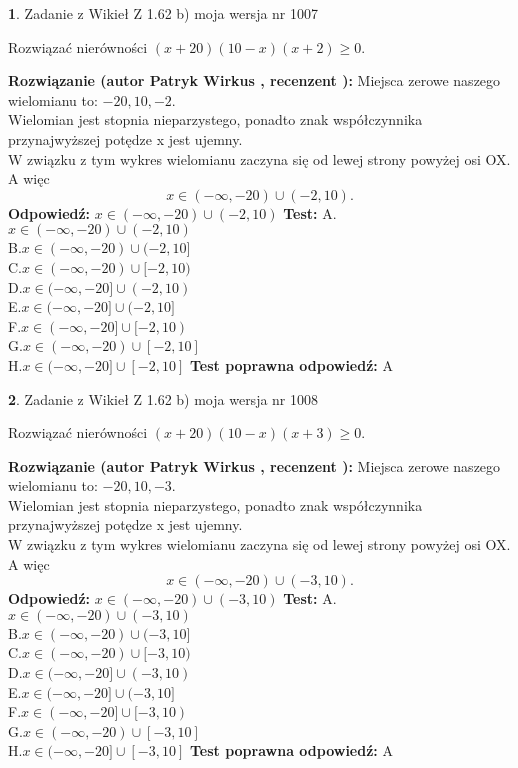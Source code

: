 \documentclass[12pt, a4paper]{article}
\theoremstyle{definition} %
\newtheorem{zad}{}
\newcommand{\zadStart}[1]{\begin{zad}#1\newline}
\newcommand{\zadStop}{\end{zad}}
\newcommand{\rozwStart}[2]{\noindent \textbf{Rozwiązanie (autor #1 , recenzent #2): }\newline}
\newcommand{\rozwStop}{\newline}
\newcommand{\odpStart}{\noindent \textbf{Odpowiedź:}\newline}
\newcommand{\odpStop}{\newline}
\newcommand{\testStart}{\noindent \textbf{Test:}\newline}
\newcommand{\testStop}{\newline}
\newcommand{\kluczStart}{\noindent \textbf{Test poprawna odpowiedź:}\newline}
\newcommand{\kluczStop}{\newline}
\begin{document}
\zadStart{Zadanie z Wikieł Z 1.62 b) moja wersja nr 1007}

Rozwiązać nierówności $(x+20)(10-x)(x+2)\ge0$.
\zadStop
\rozwStart{Patryk Wirkus}{}
Miejsca zerowe naszego wielomianu to: $-20, 10, -2$.\\
Wielomian jest stopnia nieparzystego, ponadto znak współczynnika przy\linebreak najwyższej potędze x jest ujemny.\\ W związku z tym wykres wielomianu zaczyna się od lewej strony powyżej osi OX. A więc $$x \in (-\infty,-20) \cup (-2,10).$$
\rozwStop
\odpStart
$x \in (-\infty,-20) \cup (-2,10)$
\odpStop
\testStart
A.$x \in (-\infty,-20) \cup (-2,10)$\\
B.$x \in (-\infty,-20) \cup (-2,10]$\\
C.$x \in (-\infty,-20) \cup [-2,10)$\\
D.$x \in (-\infty,-20] \cup (-2,10)$\\
E.$x \in (-\infty,-20] \cup (-2,10]$\\
F.$x \in (-\infty,-20] \cup [-2,10)$\\
G.$x \in (-\infty,-20) \cup [-2,10]$\\
H.$x \in (-\infty,-20] \cup [-2,10]$
\testStop
\kluczStart
A
\kluczStop



\zadStart{Zadanie z Wikieł Z 1.62 b) moja wersja nr 1008}

Rozwiązać nierówności $(x+20)(10-x)(x+3)\ge0$.
\zadStop
\rozwStart{Patryk Wirkus}{}
Miejsca zerowe naszego wielomianu to: $-20, 10, -3$.\\
Wielomian jest stopnia nieparzystego, ponadto znak współczynnika przy\linebreak najwyższej potędze x jest ujemny.\\ W związku z tym wykres wielomianu zaczyna się od lewej strony powyżej osi OX. A więc $$x \in (-\infty,-20) \cup (-3,10).$$
\rozwStop
\odpStart
$x \in (-\infty,-20) \cup (-3,10)$
\odpStop
\testStart
A.$x \in (-\infty,-20) \cup (-3,10)$\\
B.$x \in (-\infty,-20) \cup (-3,10]$\\
C.$x \in (-\infty,-20) \cup [-3,10)$\\
D.$x \in (-\infty,-20] \cup (-3,10)$\\
E.$x \in (-\infty,-20] \cup (-3,10]$\\
F.$x \in (-\infty,-20] \cup [-3,10)$\\
G.$x \in (-\infty,-20) \cup [-3,10]$\\
H.$x \in (-\infty,-20] \cup [-3,10]$
\testStop
\kluczStart
A
\kluczStop
\end{document}
